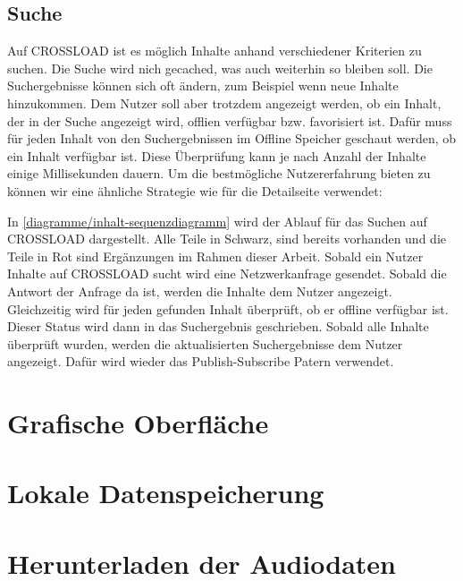 \subsection{Suche}
Auf CROSSLOAD ist es möglich Inhalte anhand verschiedener Kriterien zu suchen. Die Suche wird nich gecached, was auch weiterhin so bleiben soll. Die Suchergebnisse können sich oft ändern, zum Beispiel wenn neue Inhalte hinzukommen. Dem Nutzer soll aber trotzdem angezeigt werden, ob ein Inhalt, der in der Suche angezeigt wird, offlien verfügbar bzw. favorisiert ist. Dafür muss für jeden Inhalt von den Suchergebnissen im Offline Speicher geschaut werden, ob ein Inhalt verfügbar ist. Diese Überprüfung kann je nach Anzahl der Inhalte einige Millisekunden dauern. Um die bestmögliche Nutzererfahrung bieten zu können wir eine ähnliche Strategie wie für die Detailseite verwendet:


In \autoref{diagramme/inhalt-sequenzdiagramm} wird der Ablauf für das Suchen auf CROSSLOAD dargestellt. Alle Teile in Schwarz, sind bereits vorhanden und die Teile in Rot sind Ergänzungen im Rahmen dieser Arbeit. Sobald ein Nutzer Inhalte auf CROSSLOAD sucht wird eine Netzwerkanfrage gesendet. Sobald die Antwort der Anfrage da ist, werden die Inhalte dem Nutzer angezeigt. Gleichzeitig wird für jeden gefunden Inhalt überprüft, ob er offline verfügbar ist. Dieser Status wird dann in das Suchergebnis geschrieben. Sobald alle Inhalte überprüft wurden, werden die aktualisierten Suchergebnisse dem Nutzer angezeigt. Dafür wird wieder das Publish-Subscribe Patern verwendet. 

\section{Grafische Oberfläche}

\section{Lokale Datenspeicherung}
\label{Kap5:Speicherung}

\section{Herunterladen der Audiodaten}
